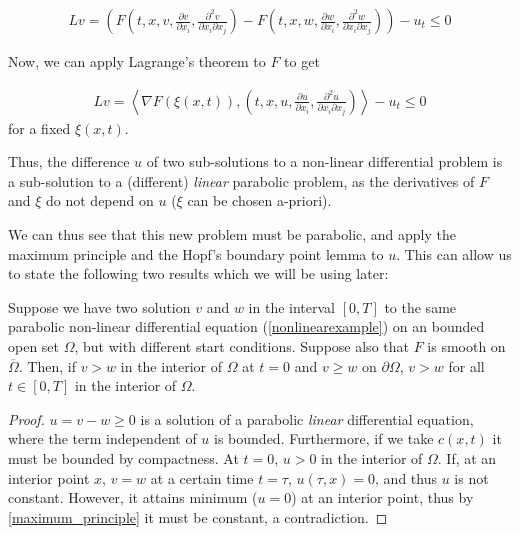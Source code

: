 \begin{align*}
	Lv= \left( F\left(t, x, v, \frac{\partial v}{\partial x_i} , \frac{\partial^2 v}{\partial x_i \partial x_j}\right) - F\left(t, x, w, \frac{\partial w}{\partial x_i} , \frac{\partial^2 w}{\partial x_i \partial x_j}\right)\right)-u_t \leq 0
\end{align*}

Now, we can apply Lagrange's theorem to $F$ to get 

\begin{align*}
	Lv= \left\langle \nabla F(\xi(x, t)), \left(t, x, u, \frac{\partial u}{\partial x_i} , \frac{\partial^2 u}{\partial x_i \partial x_j}\right) \right\rangle-u_t \leq 0
\end{align*}
for a fixed $\xi(x, t)$.


Thus, the difference $u$ of two sub-solutions to a non-linear differential problem is a sub-solution to a (different) \textit{linear} parabolic problem, as the derivatives of $F$ and $\xi$ do not depend on $u$ ($\xi$ can be chosen a-priori).

We can thus see that this new problem must be parabolic, and apply the maximum principle and the Hopf's boundary point lemma to $u$. This can allow us to state the following two results which we will be using later:

\begin{proposition}
	\label{firstapplication}
	Suppose we have two solution $v$ and $w$ in the interval $[0, T]$ to the same parabolic non-linear differential equation (\ref{nonlinearexample}) on an bounded open set $\Omega$, but with different start conditions. Suppose also that $F$ is smooth on  $\overline{\Omega}$. Then, if $v>w$ in the interior of $\Omega$ at $t=0$ and $v\geq w$ on $\partial\Omega$,  $v>w$ for all $t\in[0, T]$ in the interior of $\Omega$.
\end{proposition}

\begin{proof}
	$u=v-w\geq 0$ is a solution of a parabolic \textit{linear} differential equation, where the term independent of $u$ is bounded. Furthermore, if we take $c(x, t)$ it must be bounded by compactness. At $t=0$, $u>0$ in the interior of $\Omega$. If, at an interior point $x$, $v=w$ at a certain time $t=\tau$, $u(\tau, x)=0$, and thus $u$ is not constant. However, it attains minimum ($u=0$) at an interior point, thus by \ref{maximum_principle} it must be constant, a contradiction. 
\end{proof}

